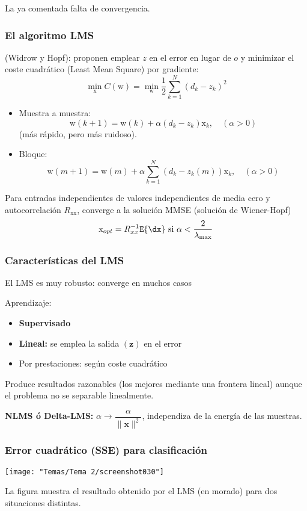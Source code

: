 La ya comentada falta de convergencia.
\subsubsection{El algoritmo LMS}
(Widrow y Hopf): proponen emplear $z$ en el error en lugar de $o$ y minimizar el coste cuadrático (Least Mean Square) por gradiente: \[ \min_{\mathrm{x}}C(\mathrm{w})=\min_{\mathrm{w}}\dfrac{1}{2}\sum_{k=1}^{N}(d_k-z_k)^2 \]
\begin{itemize}
	\item Muestra a muestra: \[ \mathrm{w}(k+1)=\mathrm{w}(k)+\alpha(d_k-z_k)\mathrm{x}_k,\quad(\alpha>0) \] (más rápido, pero más ruidoso).
	\item Bloque: \[ \mathrm{w}(m+1)=\mathrm{w}(m)+\alpha\sum_{k=1}^{N}(d_k-z_k(m))\mathrm{x}_k,\quad(\alpha>0) \]
\end{itemize}

Para entradas independientes de valores independientes de media cero y autocorrelación $R_{\mathrm{xx}}$, converge a la solución MMSE (solución de Wiener-Hopf) \[ \mathrm{x}_{opt}=R_{xx}^{-1}\mathtt{E}\{\dx\}\text{ si }\alpha<\dfrac{2}{\lambda_{\max}} \]
\subsubsection{Características del LMS}
El LMS es muy robusto: converge en muchos casos

Aprendizaje:
\begin{itemize}
	\item \textbf{Supervisado}
	\item \textbf{Lineal:} se emplea la salida $(\mathbf{z})$ en el error
	\item Por prestaciones: según coste cuadrático
\end{itemize}
Produce resultados razonables (los mejores mediante una frontera lineal) aunque el problema no se separable linealmente.

\textbf{NLMS ó Delta-LMS:} $\alpha\longrightarrow\dfrac{\alpha}{\|\mathbf{x}\|^2}$, independiza de la energía de las muestras.
\subsubsection{Error cuadrático (SSE) para clasificación}
\begin{center}
	\texttt{[image: "Temas/Tema 2/screenshot030"]}
\end{center}
La figura muestra el resultado obtenido por el LMS (en morado) para dos situaciones distintas.
